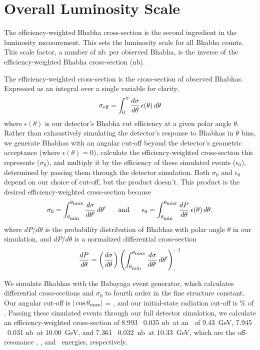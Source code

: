 \documentclass{cornell}
\begin{document}
\section{Overall Luminosity Scale}

The efficiency-weighted Bhabha cross-section is the second ingredient
in the luminosity measurement.  This sets the luminosity scale for all
Bhabha counts.  This scale factor, a number of nb\inv\ per observed
Bhabha, is the inverse of the efficiency-weighted Bhabha cross-section
(nb).

The efficiency-weighted cross-section is the cross-section of observed
Bhabhas.  Expressed as an integral over a single variable for clarity,
\begin{equation}
  \sigma_{\mbox{\scriptsize eff}} = \int_0^\pi \frac{d\sigma}{d\theta} \,
  \epsilon(\theta) \, d\theta
  \label{eqn:effectivecrosssection}
\end{equation}
where $\epsilon(\theta)$ is our detector's Bhabha cut efficiency at a
given polar angle $\theta$.  Rather than exhaustively simulating the
detector's response to Bhabhas in $\theta$ bins, we generate Bhabhas
with an angular cut-off beyond the detector's geometric acceptance
(where $\epsilon(\theta) = 0$), calculate the efficiency-weighted cross-section
this represents ($\sigma_0$), and multiply it by the efficiency of
these simulated events ($\epsilon_0$), determined by passing them
through the detector simulation.  Both $\sigma_0$ and $\epsilon_0$
depend on our choice of cut-off, but the product doesn't.  This
product is the desired efficiency-weighted cross-section because
\begin{equation}
  \sigma_0 = \int_{\theta_{\mbox{\scriptsize min}}}^{\theta_{\mbox{\scriptsize max}}}
  \frac{d\sigma}{d\theta'} \, d\theta'
  \mbox{\hspace{0.5 cm} and \hspace{0.5 cm}}
  \epsilon_0 = \int_{\theta_{\mbox{\scriptsize min}}}^{\theta_{\mbox{\scriptsize max}}}
  \frac{dP}{d\theta} \, \epsilon(\theta) \, d\theta \mbox{.}
\end{equation}
where $dP/d\theta$ is the probability distribution of Bhabhas with
polar angle $\theta$ in our simulation, and $dP/d\theta$ is a
normalized differential cross-section
\begin{equation}
  \frac{dP}{d\theta} = \left(\frac{d\sigma}{d\theta}\right) \left(
  \int_{\theta_{\mbox{\scriptsize min}}}^{\theta_{\mbox{\scriptsize max}}}
  \frac{d\sigma}{d\theta'} \, d\theta' \right)^{-1}_{\mbox{\normalsize .}}
\end{equation}

We simulate Bhabhas with the Babayaga event generator, which
calculates differential cross-sections and $\sigma_0$ to fourth order
in the fine structure constant.  Our angular cut-off is
$|\cos\theta_{\mbox{\scriptsize max}}|$ = \bork, and our initial-state radiation
cut-off is \bork\% of \ecm.  Passing these simulated events through
our full detector simulation, we calculate an efficiency-weighted cross-section
of 8.993 \PM\ 0.035 nb\inv\ at an \ecm\ of 9.43~GeV, 7.945 \PM\ 0.031
nb\inv\ at 10.00~GeV, and 7.361 \PM\ 0.032~nb\inv\ at 10.33~GeV, which
are the off-resonance \us, \uss, and \usss\ energies, respectively.
\end{document}
